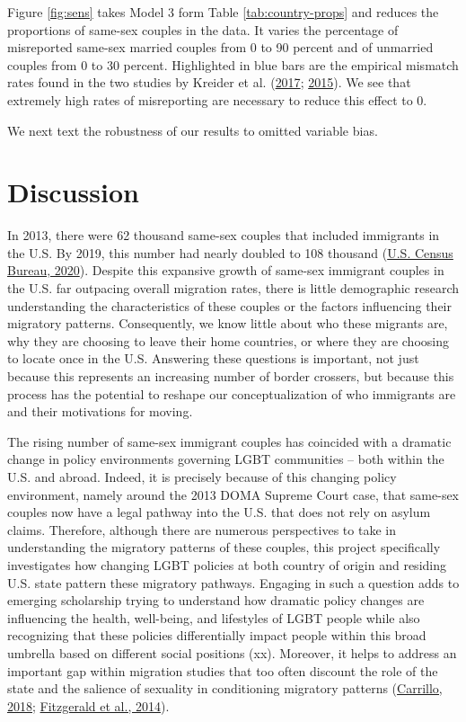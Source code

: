 \documentclass[
  11pt,
]{article}
\begin{document}
Figure \ref{fig:sens} takes Model 3 form Table \ref{tab:country-props} and reduces the proportions of same-sex couples in the data. It varies the percentage of misreported same-sex married couples from 0 to 90 percent and of unmarried couples from 0 to 30 percent. Highlighted in blue bars are the empirical mismatch rates found in the two studies by Kreider et al. (\protect\hyperlink{ref-kreider_2017}{2017}; \protect\hyperlink{ref-kreider_2015}{2015}). We see that extremely high rates of misreporting are necessary to reduce this effect to 0.

We next text the robustness of our results to omitted variable bias.

\hypertarget{discussion}{%
\section{Discussion}\label{discussion}}

In 2013, there were 62 thousand same-sex couples that included immigrants in the U.S. By 2019, this number had nearly doubled to 108 thousand (\protect\hyperlink{ref-u.s.censusbureau_2020}{U.S. Census Bureau, 2020}). Despite this expansive growth of same-sex immigrant couples in the U.S. far outpacing overall migration rates, there is little demographic research understanding the characteristics of these couples or the factors influencing their migratory patterns. Consequently, we know little about who these migrants are, why they are choosing to leave their home countries, or where they are choosing to locate once in the U.S. Answering these questions is important, not just because this represents an increasing number of border crossers, but because this process has the potential to reshape our conceptualization of who immigrants are and their motivations for moving.

The rising number of same-sex immigrant couples has coincided with a dramatic change in policy environments governing LGBT communities -- both within the U.S. and abroad. Indeed, it is precisely because of this changing policy environment, namely around the 2013 DOMA Supreme Court case, that same-sex couples now have a legal pathway into the U.S. that does not rely on asylum claims. Therefore, although there are numerous perspectives to take in understanding the migratory patterns of these couples, this project specifically investigates how changing LGBT policies at both country of origin and residing U.S. state pattern these migratory pathways. Engaging in such a question adds to emerging scholarship trying to understand how dramatic policy changes are influencing the health, well-being, and lifestyles of LGBT people while also recognizing that these policies differentially impact people within this broad umbrella based on different social positions (xx). Moreover, it helps to address an important gap within migration studies that too often discount the role of the state and the salience of sexuality in conditioning migratory patterns (\protect\hyperlink{ref-carrillo_2018}{Carrillo, 2018}; \protect\hyperlink{ref-fitzgerald_2014}{Fitzgerald et al., 2014}).
\end{document}
